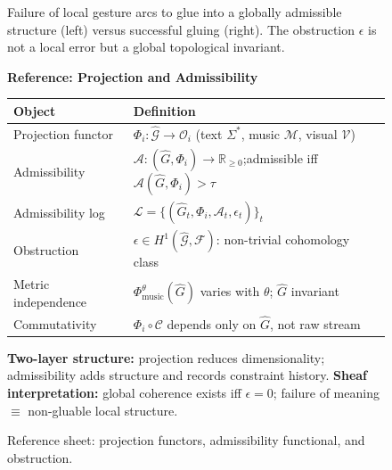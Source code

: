 \documentclass[11pt, a4paper]{article}
\begin{document}
\begin{figure}[h]
\centering
{}
\caption{Failure of local gesture arcs to glue into a globally admissible
structure (left) versus successful gluing (right). The obstruction $\epsilon$
is not a local error but a global topological invariant.}
\label{fig:obstruction}
\end{figure}

\begin{figure}[H]
\centering
\small
\begin{minipage}{0.95\textwidth}
\textbf{Reference: Projection and Admissibility}
\medskip

\begin{tabular}{@{}p{3.6cm}p{9.8cm}@{}}
\toprule
\textbf{Object} & \textbf{Definition} \\
\midrule
Projection functor & $\Phi_i:\hat{\mathcal{G}}\to\mathcal{O}_i$ \quad (text $\Sigma^*$, music $\mathcal{M}$, visual $\mathcal{V}$) \\
Admissibility & $\mathcal{A}:(\hat{G},\Phi_i)\to\mathbb{R}_{\ge0}$;\quad admissible iff $\mathcal{A}(\hat{G},\Phi_i)>\tau$ \\
Admissibility log & $\mathcal{L}=\{(\hat{G}_t,\Phi_i,\mathcal{A}_t,\epsilon_t)\}_t$ \\
Obstruction & $\epsilon\in H^1(\hat{\mathcal{G}},\mathcal{F})$: non-trivial cohomology class \\
Metric independence & $\Phi_{\mathrm{music}}^\theta(\hat{G})$ varies with $\theta$; $\hat{G}$ invariant \\
Commutativity & $\Phi_i\circ\mathcal{C}$ depends only on $\hat{G}$, not raw stream \\
\bottomrule
\end{tabular}

\medskip
\textbf{Two-layer structure:} projection reduces dimensionality; admissibility adds
structure and records constraint history.
\quad\textbf{Sheaf interpretation:} global coherence exists iff $\epsilon=0$;
failure of meaning $\equiv$ non-gluable local structure.
\end{minipage}
\caption{Reference sheet: projection functors, admissibility functional, and obstruction.}
\label{fig:cheat-proj}
\end{figure}
\end{document}
